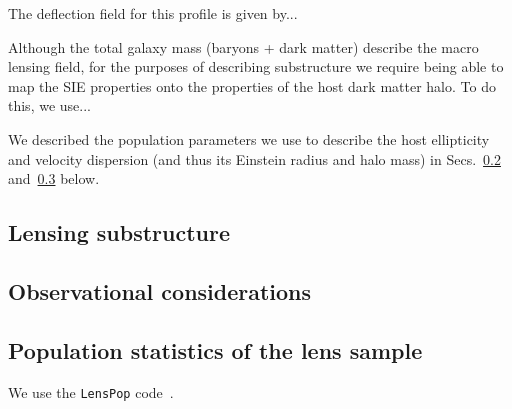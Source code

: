 \documentclass[twocolumn]{aastex62}
\begin{document}
The deflection field for this profile is given by...

Although the total galaxy mass (baryons + dark matter) describe the macro lensing field, for the purposes of describing substructure we require being able to map the SIE properties onto the properties of the host dark matter halo. To do this, we use... 

We described the population parameters we use to describe the host ellipticity and velocity dispersion (and thus its Einstein radius and halo mass) in Secs.~\ref{sec:observations} and~\ref{sec:populations} below.


\subsection{Lensing substructure}

\subsection{Observational considerations}
\label{sec:observations}


\subsection{Population statistics of the lens sample}
\label{sec:populations}

We use the \texttt{LensPop} code~\citep{Collett:2015roa}.


\acknowledgements


\software{
}



\end{document}
